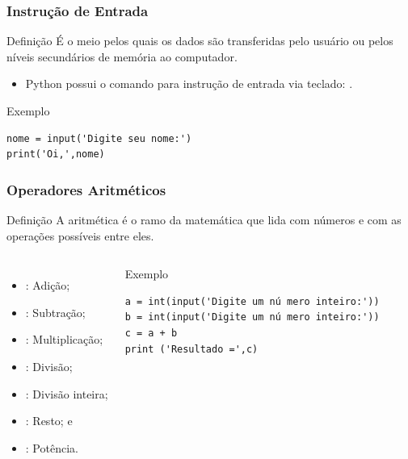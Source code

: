 \documentclass[aspectratio=169]{beamer} %
\begin{document}
\begin{frame}[fragile]
\frametitle{Instrução de Entrada}

\begin{block}{Definição}
É o meio pelos quais os dados são transferidas pelo usuário ou pelos níveis secundários de memória ao computador.
\end{block}\vfill

\begin{itemize}
	\item Python possui o comando para instrução de entrada via teclado: .
\end{itemize}\vfill

\begin{exampleblock}{Exemplo}
	\begin{lstlisting}
nome = input('Digite seu nome:')
print('Oi,',nome)
	\end{lstlisting}
\end{exampleblock}
\end{frame}

\begin{frame}[fragile]
\frametitle{Operadores Aritméticos}

\begin{block}{Definição}
A aritmética é o ramo da matemática que lida com números e com as operações possíveis entre eles.
\end{block} \vfill

 \begin{columns}[c]


\begin{itemize}
	\item \structure{+} : Adição;
	\item \structure{-} : Subtração;
	\item \structure{*} : Multiplicação;
	\item \structure{/}  : Divisão;
	\item \structure{//}  : Divisão inteira;
	\item \structure{\%} : Resto; e
	\item \structure{**} : Potência.
\end{itemize}\vfill

\begin{exampleblock}{Exemplo}
	\begin{lstlisting}
a = int(input('Digite um nú mero inteiro:'))
b = int(input('Digite um nú mero inteiro:'))
c = a + b
print ('Resultado =',c)
	\end{lstlisting}
\end{exampleblock}
\end{columns}
\end{frame}
\end{document}
